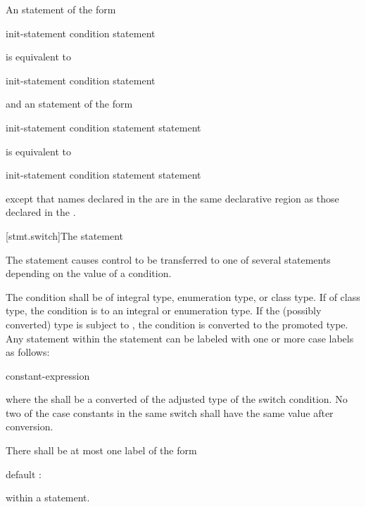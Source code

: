 \pnum
An  statement of the form
\begin{ncsimplebnf}
  \terminal{(} init-statement condition \terminal{)} statement
\end{ncsimplebnf}
is equivalent to
\begin{ncsimplebnf}
\terminal{\{}\br
\bnfindent init-statement\br
\bnfindent {}  \terminal{(} condition \terminal{)} statement\br
\terminal{\}}
\end{ncsimplebnf}
and an  statement of the form
\begin{ncsimplebnf}
  \terminal{(} init-statement condition \terminal{)} statement  statement
\end{ncsimplebnf}
is equivalent to
\begin{ncsimplebnf}
\terminal{\{}\br
\bnfindent init-statement\br
\bnfindent {}  \terminal{(} condition \terminal{)} statement  statement\br
\terminal{\}}
\end{ncsimplebnf}
except that names declared in the  are in
the same declarative region as those declared in the
.

[stmt.switch]{The  statement}%

\pnum
The  statement causes control to be transferred to one of
several statements depending on the value of a condition.

\pnum
The condition shall be of integral type, enumeration type, or class
type. If of class type, the
condition is  to
an integral or enumeration type.
If the (possibly converted) type is subject to , the condition is converted
to the promoted type.
Any
statement within the  statement can be labeled with one or
more case labels as follows:
\begin{ncbnf}
%
 constant-expression \terminal{:}
\end{ncbnf}
where the  shall be
a converted  of the
adjusted type of the switch condition. No two of the case constants in
the same switch shall have the same value after conversion.

\pnum
{}%
There shall be at most one label of the form
\begin{codeblock}
default :
\end{codeblock}
within a  statement.


